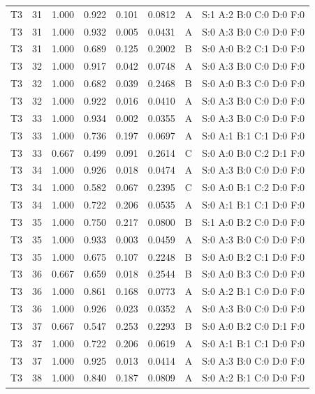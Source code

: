 \begin{longtable}{lrrrrrll}
T3 & 31 & 1.000 & 0.922 & 0.101 & 0.0812 & A & \tiny S:1 A:2 B:0 C:0 D:0 F:0 \\
T3 & 31 & 1.000 & 0.932 & 0.005 & 0.0431 & A & \tiny S:0 A:3 B:0 C:0 D:0 F:0 \\
T3 & 31 & 1.000 & 0.689 & 0.125 & 0.2002 & B & \tiny S:0 A:0 B:2 C:1 D:0 F:0 \\
T3 & 32 & 1.000 & 0.917 & 0.042 & 0.0748 & A & \tiny S:0 A:3 B:0 C:0 D:0 F:0 \\
T3 & 32 & 1.000 & 0.682 & 0.039 & 0.2468 & B & \tiny S:0 A:0 B:3 C:0 D:0 F:0 \\
T3 & 32 & 1.000 & 0.922 & 0.016 & 0.0410 & A & \tiny S:0 A:3 B:0 C:0 D:0 F:0 \\
T3 & 33 & 1.000 & 0.934 & 0.002 & 0.0355 & A & \tiny S:0 A:3 B:0 C:0 D:0 F:0 \\
T3 & 33 & 1.000 & 0.736 & 0.197 & 0.0697 & A & \tiny S:0 A:1 B:1 C:1 D:0 F:0 \\
T3 & 33 & 0.667 & 0.499 & 0.091 & 0.2614 & C & \tiny S:0 A:0 B:0 C:2 D:1 F:0 \\
T3 & 34 & 1.000 & 0.926 & 0.018 & 0.0474 & A & \tiny S:0 A:3 B:0 C:0 D:0 F:0 \\
T3 & 34 & 1.000 & 0.582 & 0.067 & 0.2395 & C & \tiny S:0 A:0 B:1 C:2 D:0 F:0 \\
T3 & 34 & 1.000 & 0.722 & 0.206 & 0.0535 & A & \tiny S:0 A:1 B:1 C:1 D:0 F:0 \\
T3 & 35 & 1.000 & 0.750 & 0.217 & 0.0800 & B & \tiny S:1 A:0 B:2 C:0 D:0 F:0 \\
T3 & 35 & 1.000 & 0.933 & 0.003 & 0.0459 & A & \tiny S:0 A:3 B:0 C:0 D:0 F:0 \\
T3 & 35 & 1.000 & 0.675 & 0.107 & 0.2248 & B & \tiny S:0 A:0 B:2 C:1 D:0 F:0 \\
T3 & 36 & 0.667 & 0.659 & 0.018 & 0.2544 & B & \tiny S:0 A:0 B:3 C:0 D:0 F:0 \\
T3 & 36 & 1.000 & 0.861 & 0.168 & 0.0773 & A & \tiny S:0 A:2 B:1 C:0 D:0 F:0 \\
T3 & 36 & 1.000 & 0.926 & 0.023 & 0.0352 & A & \tiny S:0 A:3 B:0 C:0 D:0 F:0 \\
T3 & 37 & 0.667 & 0.547 & 0.253 & 0.2293 & B & \tiny S:0 A:0 B:2 C:0 D:1 F:0 \\
T3 & 37 & 1.000 & 0.722 & 0.206 & 0.0619 & A & \tiny S:0 A:1 B:1 C:1 D:0 F:0 \\
T3 & 37 & 1.000 & 0.925 & 0.013 & 0.0414 & A & \tiny S:0 A:3 B:0 C:0 D:0 F:0 \\
T3 & 38 & 1.000 & 0.840 & 0.187 & 0.0809 & A & \tiny S:0 A:2 B:1 C:0 D:0 F:0 \\

\end{longtable}
